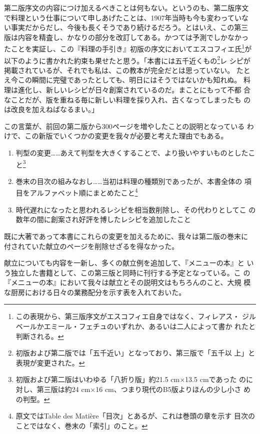 第二版序文の内容につけ加えるべきことは何もない。というのも、第二版序文
で料理という仕事について申しあげたことは、1907年当時も今も変わっていな
い事実だからだし、今後も長くそうであり続けるだろう。とはいえ、この第三
版は内容を精査し、かなりの部分を改訂してある。かつては予測でしかなかっ
たことを実証し、この『料理の手引き』初版の序文においてエスコフィエ氏\footnote{この表現から、第三版序文がエスコフィエ自身ではなく、フィレアス・
  ジルベールかエミール・フェチュのいずれか、あるいは二人によって書か
  れたと判断される。}が
以下のように書かれた約束も果せたと思う。「本書には五千近くもの\footnote{初版および第二版では「五千近い」となっており、第三版で「五千以
  上」と表現が変更された。}レ
シピが掲載されているが、それでも私は、この教本が完全だとは思っていない。
たとえ今この瞬間に完璧であったとしても、明日にはそうではないかも知れぬ。
料理は進化し、新しいレシピが日々創案されているのだ。まことにもって不都
合なことだが、版を重ねる毎に新しい料理を採り入れ、古くなってしまったも
のは改良を加えねばなるまい。」

この言葉が、前回の第二版から300ページを増やしたことの説明となっている
わけで、この新版でいくつかの変更を我々が必要と考えた理由でもある。

\begin{enumerate}
\def\labelenumi{\arabic{enumi}.}
\item
  判型の変更\ldots{}\ldots{}あえて判型を大きくすることで、より扱いやすいものとしたこと\footnote{初版および第二版はいわゆる「八折り版」約21.5
    cm×13.5 cmであった のに対し、第三版は約24 cm×16
    cm、つまり現代のB5版よりほんの少し小さ めの判型。}
\item
  巻末の目次の組みなおし\ldots{}\ldots{}当初は料理の種類別であったが、本書全体の
  項目をアルファベット順にまとめたこと\footnote{原文ではTable des
    Matière「目次」とあるが、これは巻頭の章を示す
    目次のことではなく、巻末の「索引」のこと。}
\item
  時代遅れになったと思われるレシピを相当数削除し、その代わりとしてこ
  の数年の間に創案され好評を博したレシピを追加したこと
\end{enumerate}

既に大著であって本書にこれらの変更を加えるために、我々は第二版の巻末に
付されていた献立のページを削除せざるを得なかった。

献立についても内容を一新し、多くの献立例を追加して、『メニューの本』と
いう独立した書籍として、この第三版と同時に刊行する予定となっている。こ
の『メニューの本』において我々は献立とその説明文はもちろんのこと、大規
模な厨房における日々の業務配分を示す表を入れておいた。

